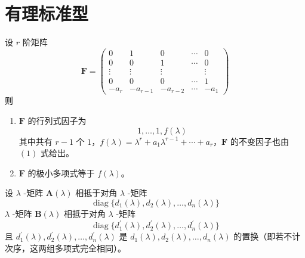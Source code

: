 
\section{有理标准型}

\begin{lemma}\label{lem:7.4.1}
    设 $r$ 阶矩阵
    \[
        \bm{F} = \begin{pmatrix}
            0      & 1          & 0          & \cdots & 0      \\
            0      & 0          & 1          & \cdots & 0      \\
            \vdots & \vdots     & \vdots     & \      & \vdots \\
            0      & 0          & 0          & \cdots & 1      \\
            -a_{r} & -a_{r - 1} & -a_{r - 2} & \cdots & -a_{1}
        \end{pmatrix}
    \]
    则
    \begin{enumerate}
        \item $\bm{F}$ 的行列式因子为
              \begin{equation}\tag{1}
                  1, \ldots, 1, f(\lambda)
              \end{equation}
              其中共有 $r - 1$ 个 $1$，$f(\lambda) = \lambda^r + a_{1}\lambda^{r - 1} + \cdots + a_{r}$，$\bm{F}$ 的不变因子也由 $(1)$ 式给出。
        \item $\bm{F}$ 的极小多项式等于 $f(\lambda)$。
    \end{enumerate}
\end{lemma}

\begin{lemma}
    设 $\lambda$ -矩阵 $\bm{A}(\lambda)$ 相抵于对角 $\lambda$ -矩阵
    \[
        \operatorname{diag}\{ d_{1}(\lambda), d_{2}(\lambda), \ldots, d_{n}(\lambda) \}
    \]
    $\lambda$ -矩阵 $\bm{B}(\lambda)$ 相抵于对角 $\lambda$ -矩阵
    \[
        \operatorname{diag}\{ d_{1}^{'}(\lambda), d_{2}^{'}(\lambda), \ldots, d_{n}^{'}(\lambda) \}
    \]
    且 $d_{1}^{'}(\lambda), d_{2}^{'}(\lambda), \ldots, d_{n}^{'}(\lambda)$ 是 $d_{1}(\lambda), d_{2}(\lambda), \ldots, d_{n}(\lambda)$ 的置换（即若不计次序，这两组多项式完全相同）。
\end{lemma}

